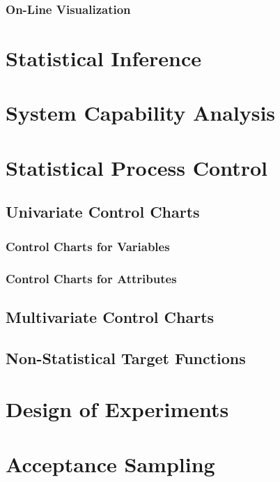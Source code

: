 \documentclass[12pt,a4paper]{report}
\begin{document}
\subsection{On-Line Visualization}



\chapter{Statistical Inference} 



\chapter{System Capability Analysis}




\chapter{Statistical Process Control}
\section{Univariate Control Charts}
\subsection{Control Charts for Variables}
\subsection{Control Charts for Attributes}



\section{Multivariate Control Charts}


\section{Non-Statistical Target Functions}



\chapter{Design of Experiments}


\chapter{Acceptance Sampling}
\end{document}
